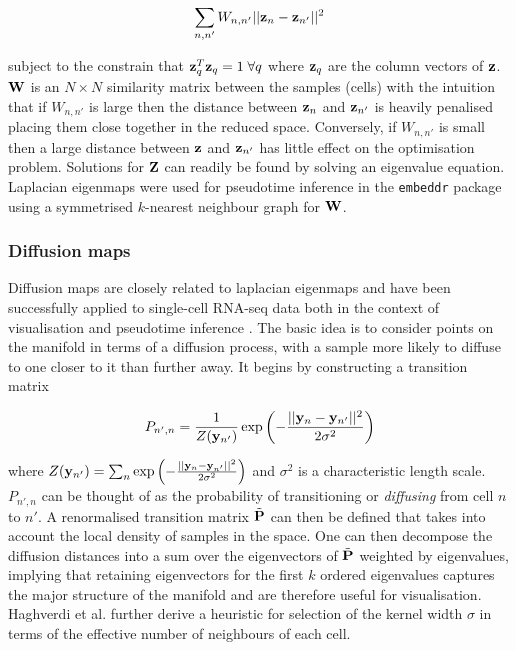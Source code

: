 \begin{equation}
  \sum_{n,n'} W_{n,n'}\lvert \lvert \mathbf{z}_n - \mathbf{z}_{n'}\rvert \rvert^2
\end{equation}

subject to the constrain that $\mathbf{z}_q^T \mathbf{z}_q = 1 \; \forall q$ where $\mathbf{z}_q$ are the column vectors of $\mathbf{z}$.
 $\mathbf{W}$ is an $N \times N$ similarity matrix between the samples (cells) with the intuition that if
$W_{n,n'}$ is large then the distance between $\mathbf{z}_n$ and $\mathbf{z}_{n'}$ is heavily penalised placing them close together in the reduced space. Conversely, if $W_{n,n'}$ is small then a large distance between $\mathbf{z}$ and $\mathbf{z}_{n'}$ has little effect on the optimisation problem. Solutions for $\mathbf{Z}$ can readily be found by solving an eigenvalue equation. %
Laplacian eigenmaps were used for pseudotime inference in the \texttt{embeddr} package \cite{campbell2015laplacian} using a symmetrised $k$-nearest neighbour graph for $\mathbf{W}$.


\subsubsection{Diffusion maps} \label{sec:diffusion_maps}

Diffusion maps are closely related to laplacian eigenmaps and have been successfully applied to single-cell RNA-seq data both in the context of visualisation \cite{Haghverdi2015} and pseudotime inference \cite{haghverdi2016diffusion}. The basic idea is to consider points on the manifold in terms of a diffusion process, with a sample more likely to diffuse to one closer to it than further away. It begins by constructing a transition matrix

\begin{equation}
  P_{n',n} = \frac{1}{Z(\mathbf{y}_{n'})} \exp\left( - \frac{\lvert \lvert \mathbf{y}_n - \mathbf{y}_{n'} \rvert \rvert^2}{2 \sigma^2}\right)
\end{equation}

where $Z(\mathbf{y}_{n'}) = \sum_{n}  \exp\left( - \frac{\lvert \lvert \mathbf{y}_n - \mathbf{y}_{n'} \rvert \rvert^2}{2 \sigma^2}\right)$ and $\sigma^2$ is a characteristic length scale. $P_{n',n}$ can be thought of as the probability of transitioning or \emph{diffusing} from cell $n$ to $n'$. A renormalised transition matrix $\tilde{\mathbf{P}}$ can then be defined that takes into account the local density of samples in the space. One can then decompose the diffusion distances into a sum over the eigenvectors of $\tilde{\mathbf{P}}$
weighted by eigenvalues,
implying that retaining eigenvectors for the first $k$ ordered eigenvalues captures the major structure of the manifold and are therefore useful for visualisation. Haghverdi et al. \cite{Haghverdi2015} further derive a heuristic for selection of the kernel width $\sigma$ in terms of the effective number of neighbours of each cell.

